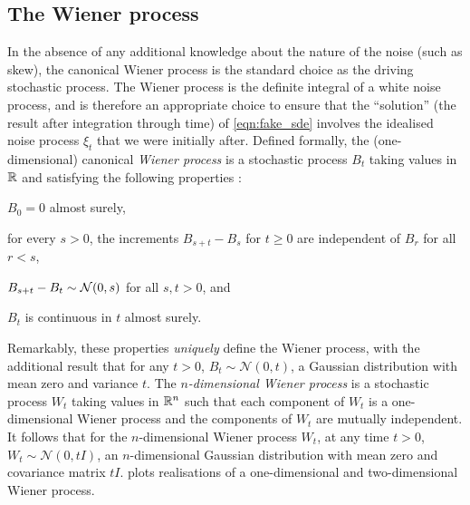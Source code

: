 \subsection{The Wiener process}
In the absence of any additional knowledge about the nature of the noise (such as skew), the canonical Wiener process is the standard choice as the driving stochastic process.
The Wiener process is the definite integral of a white noise process, and is therefore an appropriate choice to ensure that the ``solution'' (the result after integration through time) of \cref{eqn:fake_sde} involves the idealised noise process \(\xi_t\) that we were initially after. %
Defined formally, the (one-dimensional) canonical \emph{Wiener process} is a stochastic process \(B_t\) taking values in \(\mathbb{R}\) and satisfying the following properties \citep{KallianpurSundar_2014_StochasticAnalysisDiffusion}:
\begin{romanate}
	\item \(B_0 = 0\) almost surely,
	\item for every \(s > 0\), the increments \(B_{s + t} - B_{s}\) for \(t \geq 0\) are independent of \(B_r\) for all \(r < s\),
	\item \(B_{s + t} - B_t \sim\mathcal{N}\!\left(0, s\right)\) for all \(s,t > 0\), and
	\item \(B_t\) is continuous in \(t\) almost surely.
\end{romanate}
Remarkably, these properties \emph{uniquely} define the Wiener process, with the additional result that for any \(t > 0\), \(B_t \sim \mathcal{N}\left(0, t\right)\), a Gaussian distribution with mean zero and variance \(t\).
The \emph{\(n\)-dimensional Wiener process} is a stochastic process \(W_t\) taking values in \(\mathbb{R}^n\) such that each component of \(W_t\) is a one-dimensional Wiener process and the components of \(W_t\) are mutually independent.
It follows that for the \(n\)-dimensional Wiener process \(W_t\), at any time \(t > 0\), \(W_t \sim \mathcal{N}\left(0, tI\right)\), an \(n\)-dimensional Gaussian distribution with mean zero and covariance matrix \(tI\).
 plots realisations of a one-dimensional and two-dimensional Wiener process.


